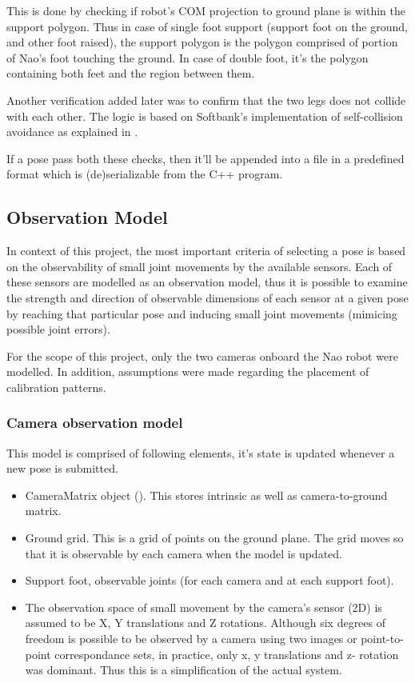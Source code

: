 \documentclass[english, printversion, nomenclature]{tuvisionthesis} %
\begin{document}
This is done by checking if robot's COM projection to ground plane is within the support polygon. Thus in case of single foot support (support foot on the ground, and other foot raised), the support polygon is the polygon comprised of portion of Nao's foot touching the ground. In case of double foot, it's the polygon containing both feet and the region between them. 

Another verification added later was to confirm that the two legs does not collide with each other. The logic is based on Softbank's implementation of self-collision avoidance as explained in .

If a pose pass both these checks, then it'll be appended into a file in a predefined format which is (de)serializable from the C++ program. 

\subsection{Observation Model}
In context of this project, the most important criteria of selecting a pose is based on the observability of small joint movements by the available sensors. Each of these sensors are modelled as an observation model, thus it is possible to examine the strength and direction of observable dimensions of each sensor at a given pose by reaching that particular pose and inducing small joint movements (mimicing possible joint errors).

For the scope of this project, only the two cameras onboard the Nao robot were modelled. In addition, assumptions were made regarding the placement of calibration patterns.

\subsubsection{Camera observation model}

This model is comprised of following elements, it's state is updated whenever a new pose is submitted.
\begin{itemize}
	\item CameraMatrix object ().
	\subitem This stores intrinsic as well as camera-to-ground matrix.
	\item Ground grid. This is a grid of points on the ground plane.
	\subitem The grid moves so that it is observable by each camera when the model is updated.
	\item Support foot, observable joints (for each camera and at each support foot). 
	\item The observation space of small movement by the camera's sensor (2D) is assumed to be X, Y translations and Z rotations.
		\subitem Although six degrees of freedom is possible to be observed by a camera using two images or point-to-point correspondance sets, in practice, only x, y translations and z- rotation was dominant.  Thus this is a simplification of the actual system.
\end{itemize}
\end{document}
